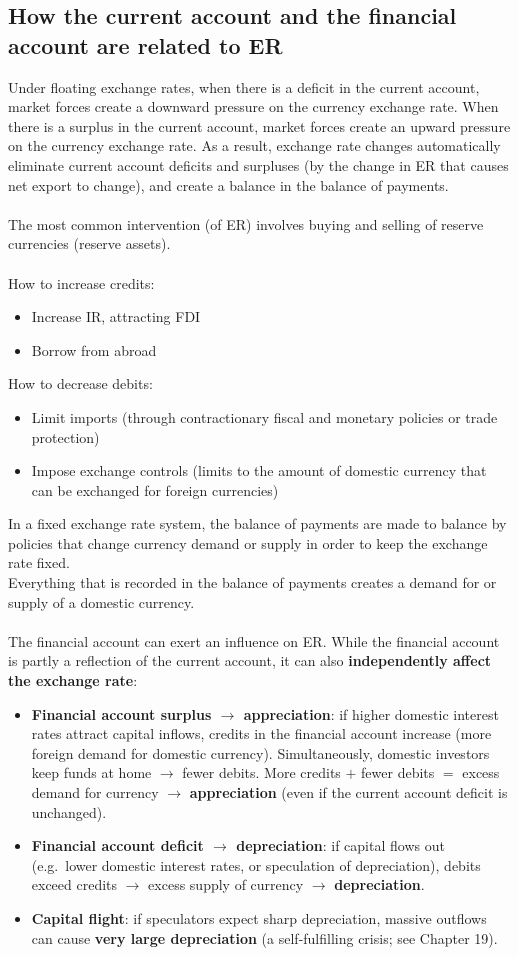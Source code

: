 \documentclass[a4paper,12pt]{article}
\begin{document}
\subsection{How the current account and the financial account are related to ER}
Under floating exchange rates, when there is a deficit in the current account, market forces create a downward pressure on the currency exchange rate. When there is a surplus in the current account, market forces create an upward pressure on the currency exchange rate. As a result, exchange rate changes automatically eliminate current account deficits and surpluses (by the change in ER that causes net export to change), and create a balance in the balance of payments.\\\\
The most common intervention (of ER) involves buying and selling of reserve currencies (reserve assets). \\\\
How to increase credits:
\begin{itemize}
  \item Increase IR, attracting FDI
  \item Borrow from abroad
\end{itemize}
How to decrease debits:
\begin{itemize}
  \item Limit imports (through contractionary fiscal and monetary policies or trade protection)
  \item Impose exchange controls (limits to the amount of domestic currency that can be exchanged for foreign currencies)
\end{itemize}
In a fixed exchange rate system, the balance of payments are made to balance by policies that change currency demand or supply in order to keep the exchange rate fixed.\\
Everything that is recorded in the balance of payments creates a demand for or supply of a domestic currency.\\\\
The financial account can exert an influence on ER. While the financial account is partly a reflection of the current account, it can also \textbf{independently affect the exchange rate}:
\begin{itemize}
  \item \textbf{Financial account surplus $\to$ appreciation}: if higher domestic interest rates attract capital inflows, credits in the financial account increase (more foreign demand for domestic currency). Simultaneously, domestic investors keep funds at home $\to$ fewer debits. More credits $+$ fewer debits $=$ excess demand for currency $\to$ \textbf{appreciation} (even if the current account deficit is unchanged).
  \item \textbf{Financial account deficit $\to$ depreciation}: if capital flows out (e.g.\ lower domestic interest rates, or speculation of depreciation), debits exceed credits $\to$ excess supply of currency $\to$ \textbf{depreciation}.
  \item \textbf{Capital flight}: if speculators expect sharp depreciation, massive outflows can cause \textbf{very large depreciation} (a self-fulfilling crisis; see Chapter 19).
\end{itemize}
\end{document}
